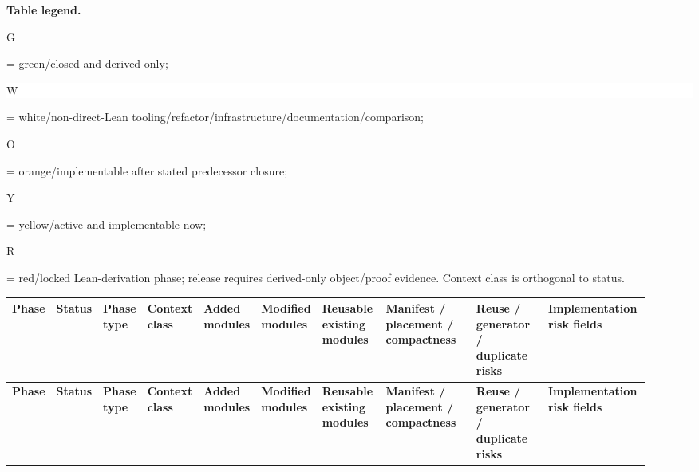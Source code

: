 \footnotesize
\par\smallskip\noindent\begin{minipage}{0.99\linewidth}\footnotesize\raggedright\textbf{Table legend.} \colorbox{green!18}{\strut G} = green/closed and derived-only; \colorbox{white}{\strut W} = white/non-direct-Lean tooling/refactor/infrastructure/documentation/comparison; \colorbox{orange!28}{\strut O} = orange/implementable after stated predecessor closure; \colorbox{yellow!25}{\strut Y} = yellow/active and implementable now; \colorbox{red!20}{\strut R} = red/locked Lean-derivation phase; release requires derived-only object/proof evidence. Context class is orthogonal to status.\end{minipage}\par\vspace{0.25em}
\begin{longtable}{L{0.026\linewidth} L{0.024\linewidth} L{0.045\linewidth} L{0.07\linewidth} L{0.065\linewidth} L{0.075\linewidth} L{0.11\linewidth} L{0.19\linewidth} L{0.155\linewidth} L{0.17\linewidth}}
\hline
\textbf{Phase} & \textbf{Status} & \textbf{Phase type} & \textbf{Context class} & \textbf{Added modules} & \textbf{Modified modules} & \textbf{Reusable existing modules} & \textbf{Manifest /\allowbreak{} placement /\allowbreak{} compactness} & \textbf{Reuse /\allowbreak{} generator /\allowbreak{} duplicate risks} & \textbf{Implementation risk fields}\\
\hline
\endfirsthead
\hline
\textbf{Phase} & \textbf{Status} & \textbf{Phase type} & \textbf{Context class} & \textbf{Added modules} & \textbf{Modified modules} & \textbf{Reusable existing modules} & \textbf{Manifest /\allowbreak{} placement /\allowbreak{} compactness} & \textbf{Reuse /\allowbreak{} generator /\allowbreak{} duplicate risks} & \textbf{Implementation risk fields}\\
\hline
\endhead

\end{longtable}
